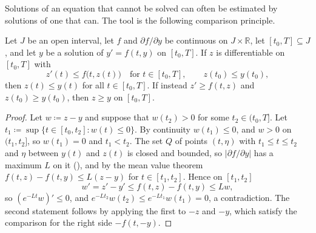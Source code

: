 Solutions of an equation that cannot be solved can often be estimated by solutions of one that can. The tool is the following comparison principle.

\begin{theorem}[Comparison]
\label{thm:comparison}
Let $J$ be an open interval, let $f$ and $\partial f/\partial y$ be continuous on $J\times\mathbb R$, let $[t_0,T]\subseteq J$, and let $y$ be a solution of $y'=f(t,y)$ on $[t_0,T]$. If $z$ is differentiable on $[t_0,T]$ with
\[
z'(t)\le f\bigl(t,z(t)\bigr)\quad\text{for }t\in[t_0,T],\qquad z(t_0)\le y(t_0),
\]
then $z(t)\le y(t)$ for all $t\in[t_0,T]$. If instead $z'\ge f(t,z)$ and $z(t_0)\ge y(t_0)$, then $z\ge y$ on $[t_0,T]$.
\end{theorem}

\begin{proof}
Let $w\coloneqq z-y$ and suppose that $w(t_2)>0$ for some $t_2\in(t_0,T]$. Let $t_1\coloneqq\sup\{t\in[t_0,t_2]:w(t)\le0\}$. By continuity $w(t_1)\le0$, and $w>0$ on $(t_1,t_2]$, so $w(t_1)=0$ and $t_1<t_2$. The set $Q$ of points $(t,\eta)$ with $t_1\le t\le t_2$ and $\eta$ between $y(t)$ and $z(t)$ is closed and bounded, so $|\partial f/\partial y|$ has a maximum $L$ on it (), and by the mean value theorem $f(t,z)-f(t,y)\le L(z-y)$ for $t\in[t_1,t_2]$. Hence on $[t_1,t_2]$
\[
w'=z'-y'\le f(t,z)-f(t,y)\le Lw ,
\]
so $(e^{-Lt}w)'\le0$, and $e^{-Lt_2}w(t_2)\le e^{-Lt_1}w(t_1)=0$, a contradiction. The second statement follows by applying the first to $-z$ and $-y$, which satisfy the comparison for the right side $-f(t,-y)$.
\end{proof}

